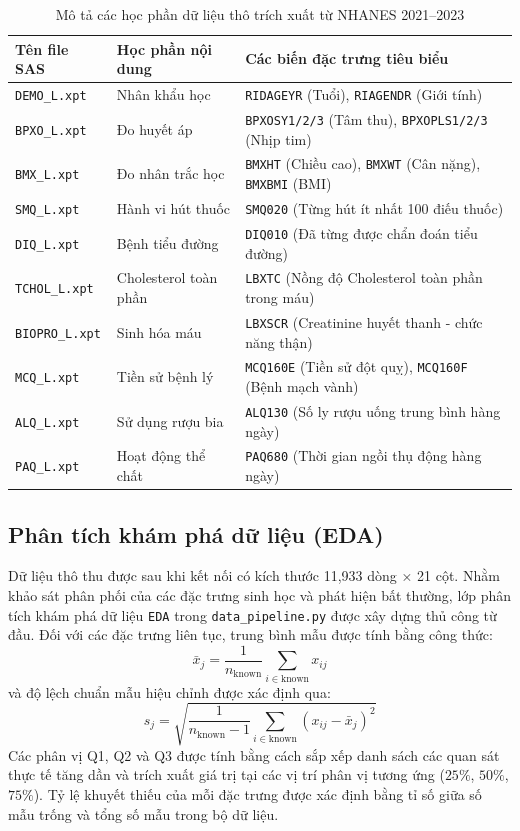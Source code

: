 \documentclass[12pt,a4paper]{article}
\begin{document}
\begin{table}[H]
\centering
\caption{Mô tả các học phần dữ liệu thô trích xuất từ NHANES 2021–2023}
\label{tab:nhanes_modules}
\small
\begin{tabular}{lll}
\toprule
\textbf{Tên file SAS} & \textbf{Học phần nội dung} & \textbf{Các biến đặc trưng tiêu biểu} \\
\midrule
\texttt{DEMO\_L.xpt} & Nhân khẩu học & \texttt{RIDAGEYR} (Tuổi), \texttt{RIAGENDR} (Giới tính) \\
\texttt{BPXO\_L.xpt} & Đo huyết áp & \texttt{BPXOSY1/2/3} (Tâm thu), \texttt{BPXOPLS1/2/3} (Nhịp tim) \\
\texttt{BMX\_L.xpt} & Đo nhân trắc học & \texttt{BMXHT} (Chiều cao), \texttt{BMXWT} (Cân nặng), \texttt{BMXBMI} (BMI) \\
\texttt{SMQ\_L.xpt} & Hành vi hút thuốc & \texttt{SMQ020} (Từng hút ít nhất 100 điếu thuốc) \\
\texttt{DIQ\_L.xpt} & Bệnh tiểu đường & \texttt{DIQ010} (Đã từng được chẩn đoán tiểu đường) \\
\texttt{TCHOL\_L.xpt} & Cholesterol toàn phần & \texttt{LBXTC} (Nồng độ Cholesterol toàn phần trong máu) \\
\texttt{BIOPRO\_L.xpt} & Sinh hóa máu & \texttt{LBXSCR} (Creatinine huyết thanh - chức năng thận) \\
\texttt{MCQ\_L.xpt} & Tiền sử bệnh lý & \texttt{MCQ160E} (Tiền sử đột quỵ), \texttt{MCQ160F} (Bệnh mạch vành) \\
\texttt{ALQ\_L.xpt} & Sử dụng rượu bia & \texttt{ALQ130} (Số ly rượu uống trung bình hàng ngày) \\
\texttt{PAQ\_L.xpt} & Hoạt động thể chất & \texttt{PAQ680} (Thời gian ngồi thụ động hàng ngày) \\
\bottomrule
\end{tabular}
\end{table}

\subsection{Phân tích khám phá dữ liệu (EDA)}
Dữ liệu thô thu được sau khi kết nối có kích thước 11,933 dòng × 21 cột. Nhằm khảo sát phân phối của các đặc trưng sinh học và phát hiện bất thường, lớp phân tích khám phá dữ liệu \texttt{EDA} trong \texttt{data\_pipeline.py} được xây dựng thủ công từ đầu. Đối với các đặc trưng liên tục, trung bình mẫu được tính bằng công thức:
\begin{equation}
\bar{x}_j = \frac{1}{n_{\text{known}}} \sum_{i \in \text{known}} x_{ij}
\end{equation}
và độ lệch chuẩn mẫu hiệu chỉnh được xác định qua:
\begin{equation}
s_j = \sqrt{\frac{1}{n_{\text{known}} - 1} \sum_{i \in \text{known}} (x_{ij} - \bar{x}_j)^2}
\end{equation}
Các phân vị Q1, Q2 và Q3 được tính bằng cách sắp xếp danh sách các quan sát thực tế tăng dần và trích xuất giá trị tại các vị trí phân vị tương ứng ($25\%$, $50\%$, $75\%$). Tỷ lệ khuyết thiếu của mỗi đặc trưng được xác định bằng tỉ số giữa số mẫu trống và tổng số mẫu trong bộ dữ liệu. 
\end{document}
